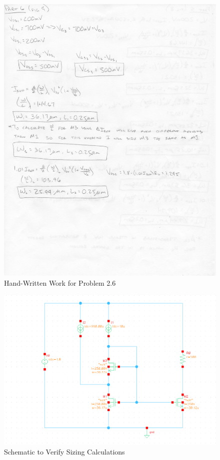 \documentclass{article}
\begin{document}
\subsection{}
\begin{figure}[H]
\centering
\includegraphics[width=6in]{1_8}
\caption{Hand-Written Work for Problem 2.6}
\label{2_6}
\end{figure}

\begin{figure}[H]
\centering
\includegraphics[width=6in]{p2_6_schem.png}
\caption{Schematic to Verify Sizing Calculations}
\label{2_6_schem}
\end{figure}
\end{document}
